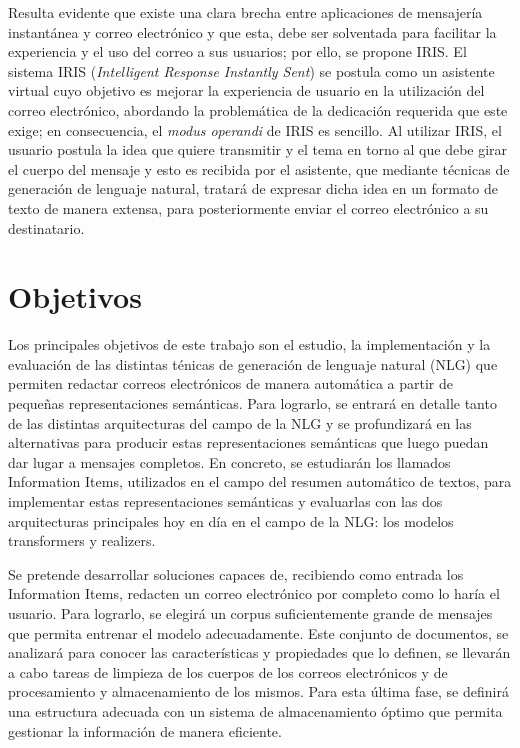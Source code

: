 Resulta evidente que existe una clara brecha entre aplicaciones de mensajería instantánea y correo electrónico y que esta, debe ser solventada para facilitar la experiencia y el uso del correo a sus usuarios; por ello, se propone IRIS. El sistema IRIS (\textit{Intelligent Response Instantly Sent}) se postula como un asistente virtual cuyo objetivo es mejorar la experiencia de usuario en la utilización del correo electrónico, abordando la problemática de la dedicación requerida que este exige; en consecuencia, el \textit{modus operandi} de IRIS es sencillo. Al utilizar IRIS, el usuario postula la idea que quiere transmitir y el tema en torno al que debe girar el cuerpo del mensaje y esto es recibida por el asistente, que mediante técnicas de generación de lenguaje natural, tratará de expresar dicha idea en un formato de texto de manera extensa, para posteriormente enviar el correo electrónico a su destinatario.


\section{Objetivos}\label{obj}
Los principales objetivos de este trabajo son el estudio, la implementación y la evaluación de las distintas ténicas de generación de lenguaje natural (NLG) que permiten redactar correos electrónicos de manera automática a partir de pequeñas representaciones semánticas. Para lograrlo, se entrará en detalle tanto de las distintas arquitecturas del campo de la NLG y se profundizará en las alternativas para producir estas representaciones semánticas que luego puedan dar lugar a mensajes completos. En concreto, se estudiarán los llamados Information Items, utilizados en el campo del resumen automático de textos, para implementar estas representaciones semánticas y evaluarlas con las dos arquitecturas principales hoy en día en el campo de la NLG: los modelos transformers y realizers.

Se pretende desarrollar soluciones capaces de, recibiendo como entrada los Information Items, redacten un correo electrónico por completo como lo haría el usuario. Para lograrlo, se elegirá un corpus suficientemente grande de mensajes que permita entrenar el modelo adecuadamente. Este conjunto de documentos, se analizará para conocer las características y propiedades que lo definen, se llevarán a cabo tareas de limpieza de los cuerpos de los correos electrónicos y de procesamiento  y almacenamiento de los mismos. Para esta última fase, se definirá una estructura adecuada con un sistema de almacenamiento óptimo que permita gestionar la información de manera eficiente.

